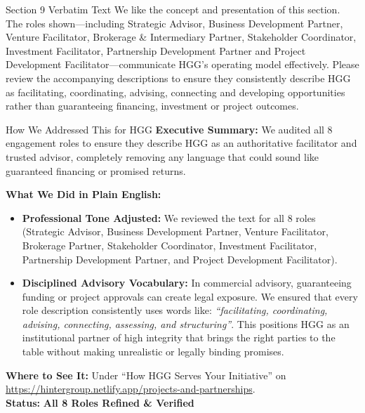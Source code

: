 \documentclass[11pt,a4paper]{article}
\begin{document}
\begin{VerbatimClientBox}{Section 9 Verbatim Text}
We like the concept and presentation of this section.
The roles shown---including Strategic Advisor, Business Development Partner, Venture Facilitator, Brokerage \& Intermediary Partner, Stakeholder Coordinator, Investment Facilitator, Partnership Development Partner and Project Development Facilitator---communicate HGG's operating model effectively.
Please review the accompanying descriptions to ensure they consistently describe HGG as facilitating, coordinating, advising, connecting and developing opportunities rather than guaranteeing financing, investment or project outcomes.
\end{VerbatimClientBox}

\begin{DetailedResolutionBox}{How We Addressed This for HGG}
\textbf{Executive Summary:} We audited all 8 engagement roles to ensure they describe HGG as an authoritative facilitator and trusted advisor, completely removing any language that could sound like guaranteed financing or promised returns.

\textbf{What We Did in Plain English:}
\begin{itemize}
    \item \textbf{Professional Tone Adjusted:} We reviewed the text for all 8 roles (Strategic Advisor, Business Development Partner, Venture Facilitator, Brokerage Partner, Stakeholder Coordinator, Investment Facilitator, Partnership Development Partner, and Project Development Facilitator).
    \item \textbf{Disciplined Advisory Vocabulary:} In commercial advisory, guaranteeing funding or project approvals can create legal exposure. We ensured that every role description consistently uses words like: \textit{``facilitating, coordinating, advising, connecting, assessing, and structuring''}. This positions HGG as an institutional partner of high integrity that brings the right parties to the table without making unrealistic or legally binding promises.
\end{itemize}

\textbf{Where to See It:} Under ``How HGG Serves Your Initiative'' on \url{https://hintergroup.netlify.app/projects-and-partnerships}. \\
\textbf{Status:} \textcolor{HGGGreen}{\textbf{All 8 Roles Refined \& Verified}}
\end{DetailedResolutionBox}

\vspace{0.3cm}
\end{document}

